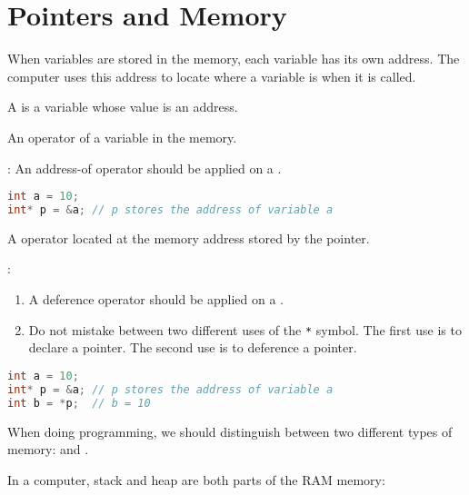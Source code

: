 \chapter{Pointers and Memory}

    \par When variables are stored in the memory, each variable has its own
      address. The computer uses this address to locate where a variable is
      when it is called.

    \par A  is a variable whose value is an address.


      \par An  operator  of a variable in
        the memory.
      \par {}: An address-of operator should be applied on a .

\begin{lstlisting}[language=C++]
int a = 10;
int* p = &a; // p stores the address of variable a
\end{lstlisting}

      \par A  operator  located at the memory
        address stored by the pointer.
      \par {}:
        \begin{enumerate}[1.]
          \item A deference operator should be applied on a .
          \item Do not mistake between two different uses of the \lstinline{*}
            symbol. The first use is to declare a pointer. The second use is to
            deference a pointer.
        \end{enumerate}
\begin{lstlisting}[language=C++]
int a = 10;
int* p = &a; // p stores the address of variable a
int b = *p;  // b = 10
\end{lstlisting}

    \par When doing programming, we should distinguish between two different
      types of memory:  and .
    \par In a computer, stack and heap are both parts of the RAM memory:

